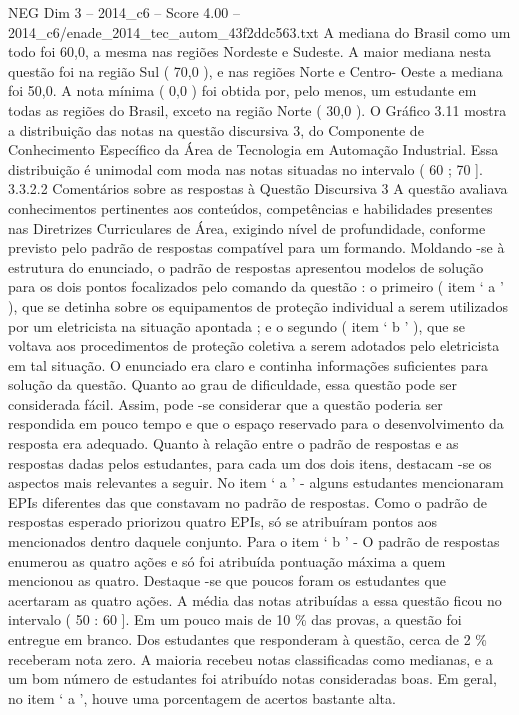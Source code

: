 \begin{textsample}{NEG Dim 3 – 2014\_c6 – Score 4.00 – 2014\_c6/enade\_2014\_tec\_autom\_43f2ddc563.txt}
A mediana do Brasil como um todo foi 60,0, a mesma nas regiões Nordeste e Sudeste.
A maior mediana nesta questão foi na região Sul ( 70,0 ), e nas regiões Norte e Centro- Oeste a mediana foi 50,0.
A nota mínima ( 0,0 ) foi obtida por, pelo menos, um estudante em todas as regiões do Brasil, exceto na região Norte ( 30,0 ).
O Gráfico 3.11 mostra a distribuição das notas na questão discursiva 3, do Componente de Conhecimento Específico da Área de Tecnologia em Automação Industrial.
Essa distribuição é unimodal com moda nas notas situadas no intervalo ( 60 ; 70 ]. 3.3.2.2 Comentários sobre as respostas à Questão Discursiva 3 A questão avaliava conhecimentos pertinentes aos conteúdos, competências e habilidades presentes nas Diretrizes Curriculares de Área, exigindo nível de profundidade, conforme previsto pelo padrão de respostas compatível para um formando.
Moldando -se à estrutura do enunciado, o padrão de respostas apresentou modelos de solução para os dois pontos focalizados pelo comando da questão : o primeiro ( item ‘ a ’ ), que se detinha sobre os equipamentos de proteção individual a serem utilizados por um eletricista na situação apontada ; e o segundo ( item ‘ b ’ ), que se voltava aos procedimentos de proteção coletiva a serem adotados pelo eletricista em tal situação.
O enunciado era claro e continha informações suficientes para solução da questão.
Quanto ao grau de dificuldade, essa questão pode ser considerada fácil.
Assim, pode -se considerar que a questão poderia ser respondida em pouco tempo e que o espaço reservado para o desenvolvimento da resposta era adequado.
Quanto à relação entre o padrão de respostas e as respostas dadas pelos estudantes, para cada um dos dois itens, destacam -se os aspectos mais relevantes a seguir.
No item ‘ a ’ - alguns estudantes mencionaram EPIs diferentes das que constavam no padrão de respostas.
Como o padrão de respostas esperado priorizou quatro EPIs, só se atribuíram pontos aos mencionados dentro daquele conjunto.
Para o item ‘ b ’ - O padrão de respostas enumerou as quatro ações e só foi atribuída pontuação máxima a quem mencionou as quatro.
Destaque -se que poucos foram os estudantes que acertaram as quatro ações.
A média das notas atribuídas a essa questão ficou no intervalo ( 50 : 60 ].
Em um pouco mais de 10 \% das provas, a questão foi entregue em branco.
Dos estudantes que responderam à questão, cerca de 2 \% receberam nota zero.
A maioria recebeu notas classificadas como medianas, e a um bom número de estudantes foi atribuído notas consideradas boas.
Em geral, no item ‘ a ’, houve uma porcentagem de acertos bastante alta.

\end{textsample}
